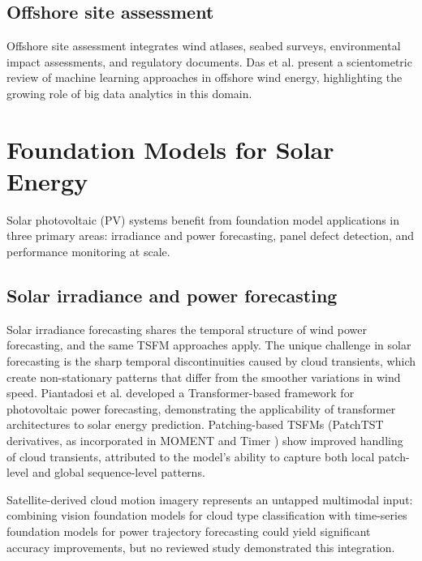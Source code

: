 \documentclass[preprint,12pt]{elsarticle}
\begin{document}
\subsection{Offshore site assessment}
\label{subsec:offshore}

Offshore site assessment integrates wind atlases, seabed surveys, environmental impact assessments, and regulatory documents. Das et al. \cite{das2024bigdata_offshore_wind} present a scientometric review of machine learning approaches in offshore wind energy, highlighting the growing role of big data analytics in this domain.

\section{Foundation Models for Solar Energy}
\label{sec:solar}

Solar photovoltaic (PV) systems benefit from foundation model applications in three primary areas: irradiance and power forecasting, panel defect detection, and performance monitoring at scale.

\subsection{Solar irradiance and power forecasting}
\label{subsec:solar_forecasting}

Solar irradiance forecasting shares the temporal structure of wind power forecasting, and the same TSFM approaches apply. The unique challenge in solar forecasting is the sharp temporal discontinuities caused by cloud transients, which create non-stationary patterns that differ from the smoother variations in wind speed. Piantadosi et al. \cite{piantadosi2024tsfm_solar_forecast} developed a Transformer-based framework for photovoltaic power forecasting, demonstrating the applicability of transformer architectures to solar energy prediction. Patching-based TSFMs (PatchTST \cite{nie2023patchtst} derivatives, as incorporated in MOMENT \cite{goswami2024moment} and Timer \cite{liu2024timer}) show improved handling of cloud transients, attributed to the model's ability to capture both local patch-level and global sequence-level patterns.

Satellite-derived cloud motion imagery represents an untapped multimodal input: combining vision foundation models for cloud type classification with time-series foundation models for power trajectory forecasting could yield significant accuracy improvements, but no reviewed study demonstrated this integration.
\end{document}
